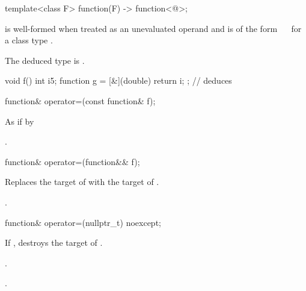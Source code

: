 \begin{itemdecl}
template<class F> function(F) -> function<@\seebelow@>;
\end{itemdecl}

\begin{itemdescr}
\pnum
\constraints
{} is well-formed
when treated as an unevaluated operand and
 is of the form
~\cv{}~
for a class type .

\pnum
\remarks
The deduced type is .

\pnum
\begin{example}
\begin{codeblock}
void f() {
  int i{5};
  function g = [&](double) { return i; };       // deduces 
}
\end{codeblock}
\end{example}
\end{itemdescr}

%
\begin{itemdecl}
function& operator=(const function& f);
\end{itemdecl}

\begin{itemdescr}
\pnum
\effects
As if by 

\pnum
\returns
{}.
\end{itemdescr}

%
\begin{itemdecl}
function& operator=(function&& f);
\end{itemdecl}

\begin{itemdescr}
\pnum
\effects
Replaces the target of 
with the target of .

\pnum
\returns
{}.
\end{itemdescr}

%
\begin{itemdecl}
function& operator=(nullptr_t) noexcept;
\end{itemdecl}

\begin{itemdescr}
\pnum
\effects
If , destroys the target of .

\pnum
\ensures
{}.

\pnum
\returns
{}.
\end{itemdescr}

